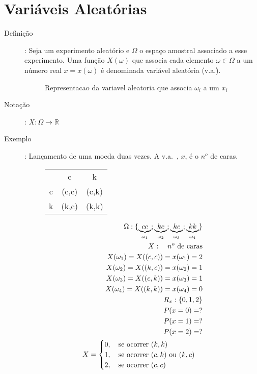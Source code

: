    \section{Variáveis Aleatórias}
   \begin{description}
     \item [Definição]: Seja um experimento aleatório e $\Omega$ o espaço amostral associado 
       a esse experimento. Uma função $X(\omega)$ que associa cada elemento $\omega \in
       \Omega$ a um número real $x=x(\omega)$ é denominada variável aleatória (v.a.\.). 
       \begin{figure}[H]
         \centering
         
         \caption{Representacao da variavel aleatoria que associa $\omega_i$ a um $x_i$}
         \label{fig:23}
       \end{figure}
     \item [Notação]: $X:\Omega \to \mathbb{R}$

     \item [Exemplo]: Lançamento de uma moeda duas vezes. A v.a.\ , $x$, é o $n^o$ de caras. 
       \begin{figure} [H]
         \centering
         \begin{tabular}{c c c}
           \toprule
           &c&k\\ \cmidrule{2-3}
           c&(c,c)&(c,k)\\ \cmidrule{2-3}
           k&(k,c)&(k,k)\\    \bottomrule
         \end{tabular}
         \label{tab:3}
       \end{figure}

       \begin{align*}
         \Omega : \{ \underbrace{cc}_{\omega_1};\underbrace{kc}_{\omega_2};\underbrace{kc}_{\omega_3};\underbrace{kk}_{\omega_4} \}\\
         X: \text{\quad $n^o$ de caras}\\
         X(\omega_1)= X((c,c))= x(\omega_1)=2\\
         X(\omega_2)= X((k,c))= x(\omega_2)=1\\
         X(\omega_3)= X((c,k))= x(\omega_3)=1\\
         X(\omega_4)= X((k,k))= x(\omega_4)=0\\
         R_x: \{0,1,2 \}\\
         P(x=0)=?\\
         P(x=1)=? \\
         P(x=2)=? \\
         X=
         \begin{cases}
           0, \text{\quad se ocorrer $(k,k)$} \\
           1, \text{\quad se ocorrer $(c,k)$ ou $(k,c)$} \\
           2,\text{\quad se ocorrer $(c,c)$}
         \end{cases}
       \end{align*}


\end{description}
